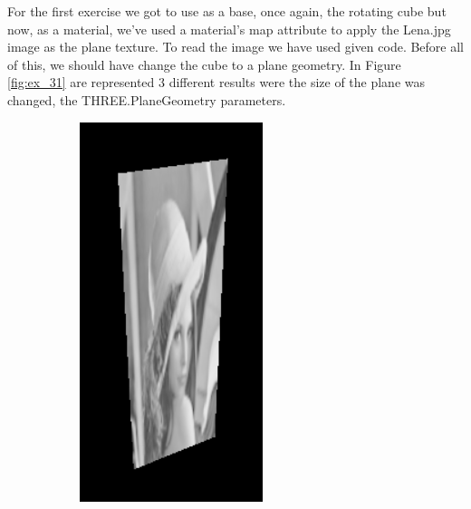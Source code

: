 \documentclass[12pt]{article}
\begin{document}
For the first exercise we got to use as a base, once again, the rotating cube but now, as a material, we've used a material's map attribute to apply the Lena.jpg image as the plane texture. To read the image we have used given code.\newline
Before all of this, we should have change the cube to a plane geometry.\newline
In Figure \ref{fig:ex_31} are represented 3 different results were the size of the plane was changed, the THREE.PlaneGeometry parameters.

\begin{figure}[!h]
\centering
    \begin{subfigure}{.33\textwidth}
        \centering
        \includegraphics[width = \textwidth]{figs/ex_31_1.png}

\end{subfigure}
\end{figure}
\end{document}
